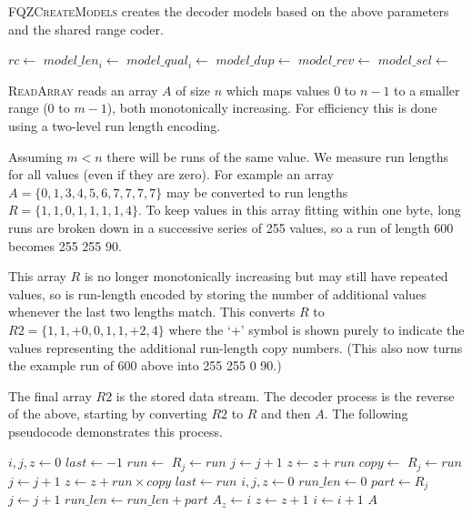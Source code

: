 \documentclass[a4paper]{article}
\begin{document}
\textsc{FQZCreateModels} creates the decoder models based on the above
parameters and the shared range coder.

\begin{program}[H]
\begin{algorithmic}[1]
  \State $rc \gets $
    \State $model\_len_i \gets $
  \EndFor
    \State $model\_qual_i \gets $
  \EndFor
  \State $model\_dup \gets $
  \State $model\_rev \gets $
    \State $model\_sel \gets $
  \EndIf
\EndProcedure
\end{algorithmic}
\end{program}

\textsc{ReadArray} reads an array $A$ of size $n$ which maps values 0
to $n-1$ to a smaller range (0 to $m-1$), both monotonically
increasing.  For efficiency this is done using a two-level run length
encoding.

Assuming $m < n$ there will be runs of the same value.  We measure run
lengths for all values (even if they are zero).  For example an array
$A = \{0,1,3,4,5,6,7,7,7,7\}$ may be converted to run lengths $R =
\{1,1,0,1,1,1,1,4\}$.  To keep values in this array fitting within one
byte, long runs are broken down in a successive series of 255 values,
so a run of length 600 becomes 255 255 90.

This array $R$ is no longer monotonically increasing but may still
have repeated values, so is run-length encoded by storing the number
of additional values whenever the last two lengths match.  This
converts $R$ to $R2 = \{1, 1, +0, 0, 1, 1, +2, 4\}$ where the `+'
symbol is shown purely to indicate the values representing the
additional run-length copy numbers.  (This also now turns the example
run of 600 above into 255 255 0 90.)

The final array $R2$ is the stored data stream.  The decoder process
is the reverse of the above, starting by converting $R2$ to $R$ and
then $A$.  The following pseudocode demonstrates this process.

\begin{algorithmic}[1]
\Statex
{}
\State $i,j,z \gets 0$
\State $last \gets -1$
 
  \State $run \gets $ 
  \State $R_j \gets run$
  \State $j \gets j+1$
  \State $z \gets z + run$
    \State $copy \gets $ 
      \State $R_j \gets run$
      \State $j \gets j+1$
    \EndFor
    \State $z \gets z + run \times copy$
  \EndIf
  \State $last \gets run$
\EndWhile
\Statex
\State $i,j,z \gets 0$
 
  \State $run\_len \gets 0$
  \Repeat
    \State $part \gets R_j$
    \State $j \gets j + 1$
    \State $run\_len \gets run\_len + part$
    \State $A_z \gets i$
    \State $z \gets z+1$
  \EndFor
  \State $i \gets i+1$
\EndWhile
\Statex
\State \Return $A$
\EndFunction
\end{algorithmic}
\end{document}
